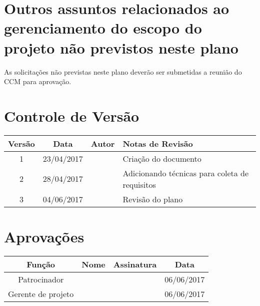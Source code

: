 \section{Outros assuntos relacionados ao gerenciamento do escopo do projeto não previstos neste plano}

As solicitações não previstas neste plano deverão ser submetidas a reunião do CCM para aprovação.

\section{Controle de Versão}

\begin{table}[H]
	\begin{tabularx}{\textwidth}{| c | c | X | X |}
		\hline
		\textbf{Versão} & \textbf{Data} & \textbf{Autor}        & \textbf{Notas de Revisão}                      \\
		\hline
		1                & 23/04/2017    & \projectManagerName{} & Criação do documento                          \\
		\hline
		2                & 28/04/2017    & \projectManagerName{} & Adicionando técnicas para coleta de requisitos \\
		\hline
		3                & 04/06/2017    & \projectManagerName{} & Revisão do plano                               \\
		\hline
	\end{tabularx}
	\centering
\end{table}

\section{Aprovações}

\begin{table}[H]
	\begin{tabularx}{\textwidth}{| c | c | X | c |}
		\hline
		\textbf{Função}  & \textbf{Nome}         & \textbf{Assinatura}        & \textbf{Data} \\
		\hline
		Patrocinador       & \projectSponsorName{} & \projectSponsorSignature{} & 06/06/2017    \\
		\hline
		Gerente de projeto & \projectManagerName{} & \projectManagerSignature{} & 06/06/2017    \\
		\hline
	\end{tabularx}
	\centering
\end{table}